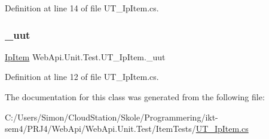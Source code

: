 Definition at line 14 of file U\+T\+\_\+\+Ip\+Item.\+cs.

\mbox{\label{class_web_api_1_1_unit_1_1_test_1_1_u_t___ip_item_a23d89e02012bf44b98a0866b7ef81df4}} 
\subsubsection{\texorpdfstring{\+\_\+uut}{\_uut}}
{\footnotesize\ttfamily \mbox{\hyperlink{class_f_w_p_s_1_1_models_1_1_ip_item}{Ip\+Item}} Web\+Api.\+Unit.\+Test.\+U\+T\+\_\+\+Ip\+Item.\+\_\+uut\hspace{0.3cm}{\ttfamily [private]}}



Definition at line 12 of file U\+T\+\_\+\+Ip\+Item.\+cs.



The documentation for this class was generated from the following file\+:\begin{DoxyCompactItemize}
\item 
C\+:/\+Users/\+Simon/\+Cloud\+Station/\+Skole/\+Programmering/ikt-\/sem4/\+P\+R\+J4/\+Web\+Api/\+Web\+Api.\+Unit.\+Test/\+Item\+Tests/\mbox{\hyperlink{_u_t___ip_item_8cs}{U\+T\+\_\+\+Ip\+Item.\+cs}}\end{DoxyCompactItemize}
